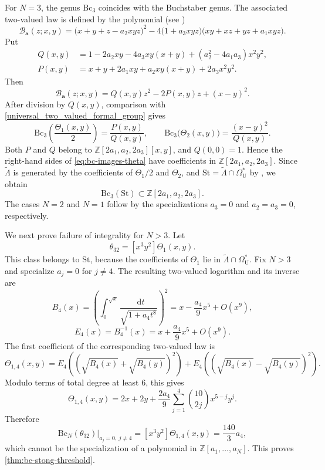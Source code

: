 \documentclass[14pt,dvipsnames]{extarticle}
\numberwithin{equation}{subsection}
\theoremstyle{plain}
\theoremstyle{definition}
\theoremstyle{definition}
\newcommand{\dd}{\mathop{}\!\mathrm d}
\newcommand{\OmU}{\Omega_{\mathrm U}^{\ast}}
\newcommand{\Bc}{\mathrm{Bc}}
\newcommand{\St}{\mathrm{St}}
\begin{document}
For $N=3$, the genus $\Bc_3$ coincides with the Buchstaber genus. The
associated two-valued law is defined by the polynomial (see \cite{Buc90,Kor26})
\begin{equation}\label{eq:buchstaber-polynomial}
 \mathcal B_{\boldsymbol{a}}(z;x,y)
 =\bigl(x+y+z-a_2xyz\bigr)^2
 -4\bigl(1+a_3xyz\bigr)
  \bigl(xy+xz+yz+a_1xyz\bigr).
\end{equation}
Put
\begin{equation}\label{eq:def-A-N-bc}
\begin{aligned}
 Q(x,y)
 &=1-2a_2xy-4a_3xy(x+y)
   +(a_2^2-4a_1a_3)x^2y^2,\\
 P(x,y)
 &=x+y+2a_1xy+a_2xy(x+y)+2a_3x^2y^2.
\end{aligned}
\end{equation}
Then
\begin{equation}\label{eq:buchstaber-polynomial-monic-data}
 \mathcal B_{\boldsymbol{a}}(z;x,y)
 =Q(x,y)z^2-2P(x,y)z+(x-y)^2.
\end{equation}
After division by $Q(x,y)$, comparison with
\eqref{universal_two_valued_formal_group} gives
\begin{equation}\label{eq:bc-images-theta}
 \Bc_3\left(\frac{\Theta_1(x,y)}2\right)
 =\frac{P(x,y)}{Q(x,y)},
 \qquad
 \Bc_3\bigl(\Theta_2(x,y)\bigr)
 =\frac{(x-y)^2}{Q(x,y)}.
\end{equation}
Both $P$ and $Q$ belong to
$\mathbb Z[2a_1,a_2,2a_3][x,y]$, and $Q(0,0)=1$. Hence the right-hand sides of
\eqref{eq:bc-images-theta} have coefficients in
$\mathbb Z[2a_1,a_2,2a_3]$. Since $\widetilde\Lambda$ is generated by the
coefficients of $\Theta_1/2$ and $\Theta_2$, and
$\St=\widetilde\Lambda\cap\OmU$ by
\cite[Theorems~4.1, 4.4 and Lemma~6.6]{Buc78}, we obtain
\[
 \Bc_3(\St)\subset\mathbb Z[2a_1,a_2,2a_3].
\]
The cases $N=2$ and $N=1$ follow by the specializations $a_3=0$ and
$a_2=a_3=0$, respectively.

We next prove failure of integrality for $N>3$. Let
\[
 \theta_{32}=[x^3y^2]\Theta_1(x,y).
\]
This class belongs to $\St$, because the coefficients of $\Theta_1$ lie in
$\widetilde\Lambda\cap\OmU$. Fix $N>3$ and specialize $a_j=0$ for $j\ne4$.
The resulting two-valued logarithm and its inverse are
\[
 B_4(x)
 =\left(\int_0^{\sqrt{x}}\frac{\dd t}{\sqrt{1+a_4t^8}}\right)^2
 =x-\frac{a_4}{9}x^5+O(x^9),
\]
\[
 E_4(x)=B_4^{-1}(x)
 =x+\frac{a_4}{9}x^5+O(x^9).
\]
The first coefficient of the corresponding two-valued law is
\[
 \Theta_{1,4}(x,y)
 =E_4\!\left((\sqrt{B_4(x)}+\sqrt{B_4(y)})^2\right)
  +E_4\!\left((\sqrt{B_4(x)}-\sqrt{B_4(y)})^2\right).
\]
Modulo terms of total degree at least $6$, this gives
\begin{equation}\label{eq:theta14-degree-five}
 \Theta_{1,4}(x,y)
 =2x+2y+\frac{2a_4}{9}
  \sum_{j=1}^{4}\binom{10}{2j}x^{5-j}y^j.
\end{equation}
Therefore
\[
\left. \Bc_N(\theta_{32})\right|_{a_j=0,\ j\ne4} = [x^3y^2]\Theta_{1,4}(x,y) =\frac{140}{3}a_4,
\]
which cannot be the specialization of a polynomial in
$\mathbb Z[a_1,\ldots,a_N]$. This proves
\cref{thm:bc-stong-threshold}.
\end{document}
